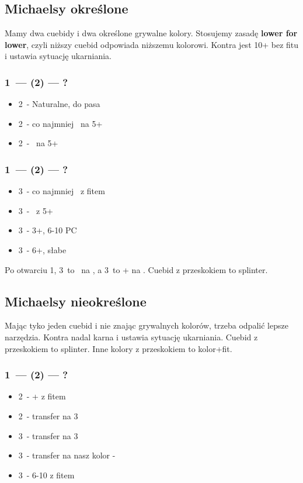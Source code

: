 \documentclass[12pt, a4paper]{article}
\begin{document}
\subsection{Michaelsy określone}
Mamy dwa cuebidy i dwa określone grywalne kolory. Stosujemy zasadę \textbf{lower for lower},
czyli niższy cuebid odpowiada niższemu kolorowi. Kontra jest 10+ bez fitu i ustawia sytuację ukarniania.

\subsubsection{1\clubs\ --- (2\clubs) --- ?}
\begin{itemize}
    \item 2\diams\ - Naturalne, do pasa
    \item 2\hearts\ - co najmniej \inv\ na 5+\clubs
    \item 2\spades\ - \gf\ na 5+\diams
\end{itemize}

\subsubsection{1\hearts\ --- (2\ntx) --- ?}
\begin{itemize}
    \item 3\clubs\ - co najmniej \inv\ z fitem \hearts
    \item 3\diams\ - \gf\ z 5+\spades
    \item 3\hearts\ - 3+\hearts, 6-10 PC
    \item 3\spades\ - 6+\spades, słabe
\end{itemize}
Po otwarciu 1\spades, 3\clubs\ to \gf\ na \hearts, a 3\diams\ to \inv+ na \spades.
Cuebid z przeskokiem to splinter.

\subsection{Michaelsy nieokreślone}
Mając tyko jeden cuebid i nie znając grywalnych kolorów, trzeba odpalić lepsze narzędzia.
Kontra nadal karna i ustawia sytuację ukarniania.
Cuebid z przeskokiem to splinter.
Inne kolory z przeskokiem to kolor+fit.
\subsubsection{1\hearts\ --- (2\hearts) --- ?}
\begin{itemize}
    \item 2\spades\ - \inv+ z fitem \hearts
    \item 2\nt\ - transfer na 3\clubs
    \item 3\clubs\ - transfer na 3\diams
    \item 3\diams\ - transfer na nasz kolor - \mixed
    \item 3\hearts\ - 6-10 z fitem \hearts
\end{itemize}
\end{document}
